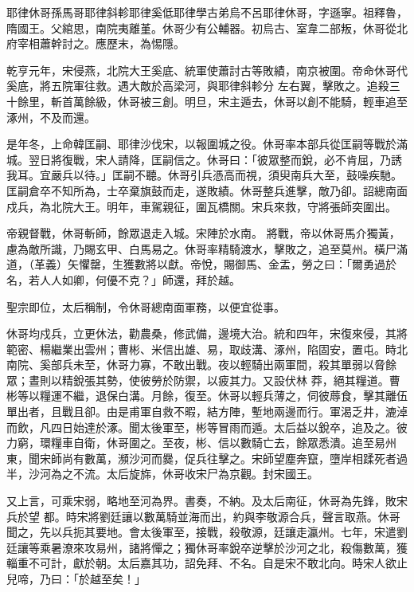 
\begin{pinyinscope}

 耶律休哥孫馬哥耶律斜軫耶律奚低耶律學古弟烏不呂耶律休哥，字遜寧。祖釋魯，隋國王。父綰思，南院夷離堇。休哥少有公輔器。初烏古、室韋二部叛，休哥從北府宰相蕭幹討之。應歷末，為惕隱。



 乾亨元年，宋侵燕，北院大王奚底、統軍使蕭討古等敗績，南京被圍。帝命休哥代奚底，將五院軍往救。遇大敵於高梁河，與耶律斜軫分
 左右翼，擊敗之。追殺三十餘里，斬首萬餘級，休哥被三創。明旦，宋主遁去，休哥以創不能騎，輕車追至涿州，不及而還。



 是年冬，上命韓匡嗣、耶律沙伐宋，以報圍城之役。休哥率本部兵從匡嗣等戰於滿城。翌日將復戰，宋人請降，匡嗣信之。休哥曰：「彼眾整而銳，必不肯屈，乃誘我耳。宜嚴兵以待。」匡嗣不聽。休哥引兵憑高而視，須臾南兵大至，鼓噪疾馳。匡嗣倉卒不知所為，士卒棄旗鼓而走，遂敗績。休哥整兵進擊，敵乃卻。詔總南面戍兵，為北院大王。明年，車駕親征，圍瓦橋關。宋兵來救，守將張師突圍出。



 帝親督戰，休哥斬師，餘眾退走入城。宋陣於水南。
 將戰，帝以休哥馬介獨黃，慮為敵所識，乃賜玄甲、白馬易之。休哥率精騎渡水，擊敗之，追至莫州。橫尸滿道，（革義）矢懼罄，生獲數將以獻。帝悅，賜御馬、金盂，勞之曰：「爾勇過於名，若人人如卿，何優不克？」師還，拜於越。



 聖宗即位，太后稱制，令休哥總南面軍務，以便宜從事。



 休哥均戍兵，立更休法，勸農桑，修武備，邊境大治。統和四年，宋復來侵，其將範密、楊繼業出雲州；曹彬、米信出雄、易，取歧溝、涿州，陷固安，置屯。時北南院、奚部兵未至，休哥力寡，不敢出戰。夜以輕騎出兩軍間，殺其單弱以脅餘眾；晝則以精銳張其勢，使彼勞於防禦，以疲其力。又設伏林
 莽，絕其糧道。曹彬等以糧運不繼，退保白溝。月餘，復至。休哥以輕兵薄之，伺彼蓐食，擊其離伍單出者，且戰且卻。由是甫軍自救不暇，結方陣，塹地兩邊而行。軍渴乏井，漉淖而飲，凡四日始達於涿。聞太後軍至，彬等冒雨而遁。太后益以銳卒，追及之。彼力窮，環糧車自衛，休哥圍之。至夜，彬、信以數騎亡去，餘眾悉潰。追至易州東，聞宋師尚有數萬，瀕沙河而爨，促兵往擊之。宋師望塵奔竄，墮岸相蹂死者過半，沙河為之不流。太后旋旆，休哥收宋尸為京觀。封宋國王。



 又上言，可乘宋弱，略地至河為界。書奏，不納。及太后南征，休哥為先鋒，敗宋兵於望
 都。時宋將劉廷讓以數萬騎並海而出，約與李敬源合兵，聲言取燕。休哥聞之，先以兵扼其要地。會太後軍至，接戰，殺敬源，廷讓走瀛州。七年，宋遣劉廷讓等乘暑潦來攻易州，諸將憚之；獨休哥率銳卒逆擊於沙河之北，殺傷數萬，獲輜重不可計，獻於朝。太后嘉其功，詔免拜、不名。自是宋不敢北向。時宋人欲止兒啼，乃曰：「於越至矣！」




\end{pinyinscope}
